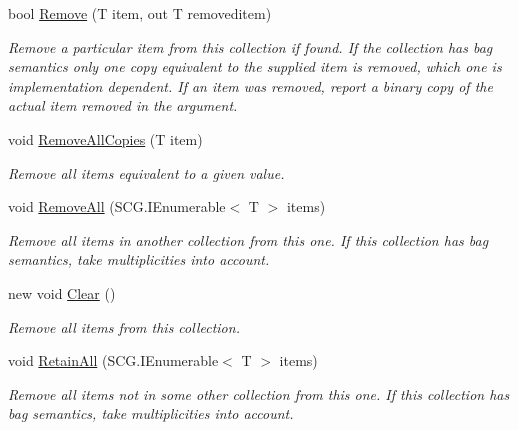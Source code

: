\begin{DoxyCompactItemize}
bool \hyperlink{interface_c5_1_1_i_collection_acbd124236c3f0958a8784d9c7c2dfd16}{Remove} (T item, out T removeditem)
\begin{DoxyCompactList}\small\item\em Remove a particular item from this collection if found. If the collection has bag semantics only one copy equivalent to the supplied item is removed, which one is implementation dependent. If an item was removed, report a binary copy of the actual item removed in the argument. \end{DoxyCompactList}\item 
void \hyperlink{interface_c5_1_1_i_collection_ad785b91be4edeb3fbe678db751f6355d}{Remove\+All\+Copies} (T item)
\begin{DoxyCompactList}\small\item\em Remove all items equivalent to a given value. \end{DoxyCompactList}\item 
void \hyperlink{interface_c5_1_1_i_collection_a9fb05163a1bd4b71bfd05101ff20c987}{Remove\+All} (S\+C\+G.\+I\+Enumerable$<$ T $>$ items)
\begin{DoxyCompactList}\small\item\em Remove all items in another collection from this one. If this collection has bag semantics, take multiplicities into account. \end{DoxyCompactList}\item 
new void \hyperlink{interface_c5_1_1_i_collection_abd83166ac00b3d36225d988fd4603e97}{Clear} ()
\begin{DoxyCompactList}\small\item\em Remove all items from this collection. \end{DoxyCompactList}\item 
void \hyperlink{interface_c5_1_1_i_collection_ac2672fb0557eeb24e328149c513c9a8b}{Retain\+All} (S\+C\+G.\+I\+Enumerable$<$ T $>$ items)
\begin{DoxyCompactList}\small\item\em Remove all items not in some other collection from this one. If this collection has bag semantics, take multiplicities into account. \end{DoxyCompactList}\end{DoxyCompactItemize}
